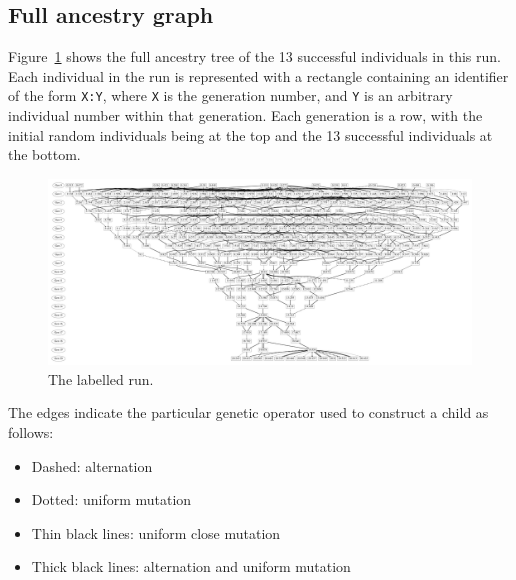 \subsection{Full ancestry graph}

Figure~\ref{fig:run0Labelled} shows the full ancestry tree of the 13 successful 
individuals in this run. Each individual in the run is represented with a
rectangle containing an identifier of the form \texttt{X:Y}, where \texttt{X}
is the generation number, and \texttt{Y} is an arbitrary individual number
within that generation. Each generation is a row, with the initial random
individuals being at the top and the 13 successful individuals at the bottom.

\begin{figure} %
	\begin{center}
		\vspace{0.6\columnwidth}
		\includegraphics[width=\columnwidth]{../figures/run0_GPTP_2_font_30}
	\end{center}
	\caption{The labelled run.}
	\label{fig:run0Labelled}       %
\end{figure}

The edges indicate the particular genetic operator used to construct a child
as follows:
\begin{itemize}
	\item Dashed: alternation
	\item Dotted: uniform mutation
	\item Thin black lines: uniform close mutation
	\item Thick black lines: alternation and uniform mutation
\end{itemize}


